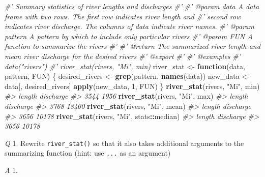 \documentclass[
]{book}
\newenvironment{Shaded}{\begin{snugshade}}{\end{snugshade}}
\newcommand{\CommentTok}[1]{\textcolor[rgb]{0.56,0.35,0.01}{\textit{#1}}}
\newcommand{\ControlFlowTok}[1]{\textcolor[rgb]{0.13,0.29,0.53}{\textbf{#1}}}
\newcommand{\DecValTok}[1]{\textcolor[rgb]{0.00,0.00,0.81}{#1}}
\newcommand{\KeywordTok}[1]{\textcolor[rgb]{0.13,0.29,0.53}{\textbf{#1}}}
\newcommand{\NormalTok}[1]{#1}
\newcommand{\OperatorTok}[1]{\textcolor[rgb]{0.81,0.36,0.00}{\textbf{#1}}}
\newcommand{\StringTok}[1]{\textcolor[rgb]{0.31,0.60,0.02}{#1}}
\begin{document}
\begin{Shaded}
\begin{Highlighting}[]
\CommentTok{#' Summary statistics of river lengths and discharges}
\CommentTok{#'}
\CommentTok{#' @param data A data frame with two rows. The first row indicates river length and}
\CommentTok{#'   second row indicates river discharge. The columns of data indicate river names.}
\CommentTok{#' @param pattern A pattern by which to include only particular rivers}
\CommentTok{#' @param FUN A function to summarize the rivers}
\CommentTok{#'}
\CommentTok{#' @return The summarized river length and mean river discharge for the desired rivers}
\CommentTok{#' @export}
\CommentTok{#'}
\CommentTok{#' @examples}
\CommentTok{#' data("rivers")}
\CommentTok{#' river_stat(rivers, "Mi", min)}
\NormalTok{river_stat <-}\StringTok{ }\ControlFlowTok{function}\NormalTok{(data, pattern, FUN) \{}
\NormalTok{  desired_rivers <-}\StringTok{ }\KeywordTok{grep}\NormalTok{(pattern, }\KeywordTok{names}\NormalTok{(data))}
\NormalTok{  new_data <-}\StringTok{ }\NormalTok{data[, desired_rivers]}
  \KeywordTok{apply}\NormalTok{(new_data, }\DecValTok{1}\NormalTok{, FUN)}
\NormalTok{\}}
\KeywordTok{river_stat}\NormalTok{(rivers, }\StringTok{"Mi"}\NormalTok{, min)}
\CommentTok{#>    length discharge }
\CommentTok{#>      3544      1956}
\KeywordTok{river_stat}\NormalTok{(rivers, }\StringTok{"Mi"}\NormalTok{, max)}
\CommentTok{#>    length discharge }
\CommentTok{#>      3768     18400}
\KeywordTok{river_stat}\NormalTok{(rivers, }\StringTok{"Mi"}\NormalTok{, mean)}
\CommentTok{#>    length discharge }
\CommentTok{#>      3656     10178}
\KeywordTok{river_stat}\NormalTok{(rivers, }\StringTok{"Mi"}\NormalTok{, stats}\OperatorTok{::}\NormalTok{median)}
\CommentTok{#>    length discharge }
\CommentTok{#>      3656     10178}
\end{Highlighting}
\end{Shaded}

\emph{Q} 1. Rewrite \texttt{river\_stat()} so that it also takes additional arguments to the summarizing function (hint: use \texttt{...} as an argument)

\emph{A} 1.
\end{document}

